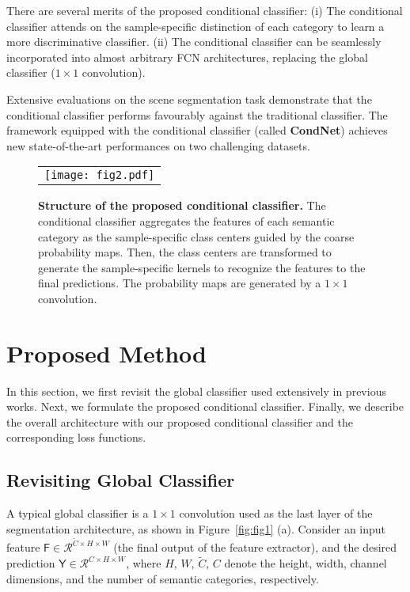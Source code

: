 \documentclass[journal]{IEEEtran}
\newcommand{\ra}[1]{\renewcommand{\arraystretch}{#1}}
\begin{document}
There are several merits of the proposed conditional classifier: 
(i) The conditional classifier attends on the sample-specific distinction of each category to learn a more discriminative classifier.
(ii) The conditional classifier can be seamlessly
incorporated into almost arbitrary FCN architectures, 
replacing the global classifier ($1\times1$ convolution).

Extensive evaluations on the scene segmentation task
demonstrate that 
the conditional classifier performs favourably against 
the traditional classifier. 
The framework equipped with 
the conditional classifier (called \textbf{CondNet})
achieves new state-of-the-art performances 
on two challenging datasets.




\begin{figure}[t]
\footnotesize
\centering
\renewcommand{\tabcolsep}{1pt} \ra{1} \begin{center}
\begin{tabular}{c}
\texttt{[image: fig2.pdf]} \\
\end{tabular}
\end{center}
\caption{\textbf{Structure of the proposed conditional classifier.}
The conditional classifier aggregates the features of each semantic category
as the sample-specific class centers 
guided by the coarse probability maps.
Then, the class centers are transformed to generate the sample-specific kernels
to recognize the features to the final predictions.
The probability maps are generated by a $1\times1$ convolution.}
\label{fig:structure}
\end{figure}




\section{Proposed Method}
\label{sec:method}
In this section,
we first revisit the global classifier used extensively in previous works.
Next,
we formulate the proposed conditional classifier.
Finally,
we describe the overall architecture with our proposed conditional classifier
and the corresponding loss functions.

\subsection{Revisiting Global Classifier}
A typical global classifier is 
a $1 \times 1$ convolution used as 
the last layer of the segmentation architecture,
as shown in Figure~\ref{fig:fig1} (a).
Consider an input feature $\mathsf{F} \in \mathcal{R}^{\tilde{C} \times H \times W}$ 
(the final output of the feature extractor), 
and the desired prediction $\mathsf{Y} \in \mathcal{R}^{C \times H \times W}$,
where $H$, $W$, $\tilde{C}$, $C$ denote the height, width, channel dimensions, and the number of semantic categories, respectively.
\end{document}
